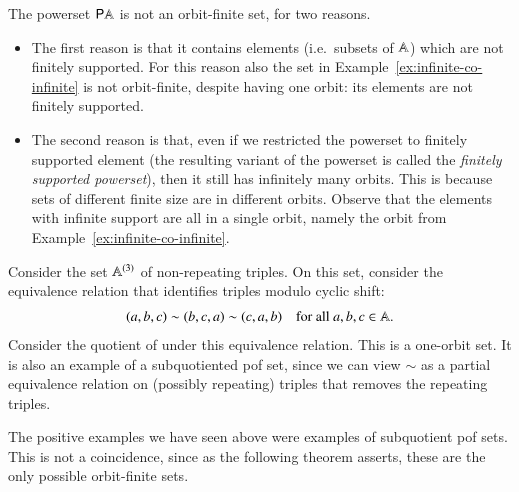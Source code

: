\begin{myexample}\label{ex:powerset-not-orbit-finite}
    The powerset ${\mathsf P} \mathbb A$ is  not an orbit-finite set, for two reasons.
    
    \begin{itemize}
        \item     The first reason is that it contains elements (i.e.~subsets of $\mathbb A$) which are not finitely supported. For this reason also the set in Example~\ref{ex:infinite-co-infinite} is not orbit-finite, despite having one orbit: its elements are not finitely supported. 
        \item       The second reason is that, even if we restricted the powerset to finitely supported element (the resulting variant of the powerset is called the \emph{finitely supported powerset}), then it still has infinitely many orbits. This is because sets of different finite size are in different orbits. Observe that the elements with infinite support are all in a single orbit, namely the orbit from Example~\ref{ex:infinite-co-infinite}. 
    \end{itemize}
\end{myexample}

\begin{myexample}\label{ex:cyclic-triples}
    Consider the set $\mathbb A^{(3)}$ of non-repeating triples. On this set, consider the equivalence relation that identifies triples modulo cyclic shift: 
    \begin{align*}
    (a,b,c) \sim (b,c,a) \sim (c,a,b) \quad \text{for all $a,b,c \in \mathbb A$}.
    \end{align*}
    Consider the quotient of under this equivalence relation. This is a one-orbit set. It is also an example of a subquotiented pof set, since we can view $\sim$ as a partial equivalence relation on (possibly repeating) triples that removes the repeating triples. 
\end{myexample}




The positive examples we have seen above were examples of subquotient pof sets. This is not a coincidence, since as the following theorem asserts, these are the only possible orbit-finite sets.


